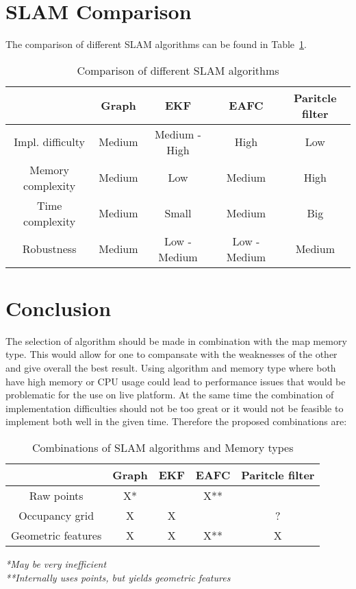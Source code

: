 \documentclass[12pt, a4paper, onecolumn]{article}
\begin{document}
\section{SLAM Comparison}
The comparison of different SLAM algorithms can be found in Table~\ref{tab:slam_algorithms}.
\begin{table}[h!]
  \begin{center}
    \begin{tabular}[c]{|c | c c c c |}
      \hline
                       & Graph          & EKF           & EAFC         & Paritcle filter \\
      \hline
      Impl. difficulty & Medium         & Medium - High & High         & Low \\
      \hline
      Memory complexity& Medium         & Low           & Medium       & High \\
      \hline
      Time complexity  & Medium         & Small         & Medium       & Big \\
      \hline
      Robustness       & Medium         & Low - Medium  & Low - Medium & Medium \\
      \hline
    \end{tabular}
  \end{center}
  \caption{Comparison of different SLAM algorithms}
  \label{tab:slam_algorithms}
\end{table}

\section{Conclusion}

The selection of algorithm should be made in combination with the map memory type.
This would allow for one to compansate with the weaknesses of the other and give overall the best result.
Using algorithm and memory type where both have high memory or CPU usage could lead to performance issues that would be problematic for the use on live platform.
At the same time the combination of implementation difficulties should not be too great or it would not be feasible to implement both well in the given time.
Therefore the proposed combinations are:

\begin{table}[h!]
  \begin{center}
    \begin{tabular}[c]{|c | c c c c |}
      \hline
                         & Graph & EKF & EAFC & Paritcle filter \\
      \hline
      Raw points         & X*    &     & X**  &  \\
      \hline
      Occupancy grid     & X     & X   &      & ? \\
      \hline
      Geometric features & X     & X   & X**  & X \\
      \hline
    \end{tabular}
  \end{center}
  \caption{Combinations of SLAM algorithms and Memory types}
  \label{tab:slam_memory_combinations}
\end{table}
\textit{*May be very inefficient} \\
\textit{**Internally uses points, but yields geometric features}
\end{document}
